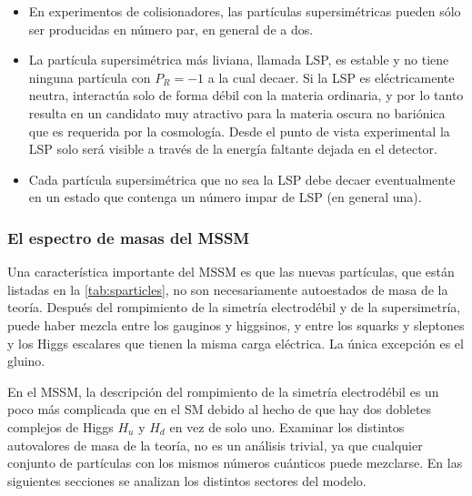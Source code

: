 \begin{itemize}
\item En experimentos de colisionadores, las partículas supersimétricas pueden
  sólo ser producidas en número par, en general de a dos.
\item La partícula supersimétrica más liviana, llamada LSP, es estable y no tiene
  ninguna partícula con $P_R = -1$ a la cual decaer. Si
  la LSP es eléctricamente neutra, interactúa solo de forma débil con la materia
  ordinaria, y por lo tanto resulta en un candidato muy atractivo para la
  materia oscura no bariónica que es requerida por la cosmología. Desde el punto de
  vista experimental la LSP solo será visible a través de la energía faltante
  dejada en el detector.
\item Cada partícula supersimétrica que no sea la LSP debe decaer eventualmente
  en un estado que contenga un número impar de LSP (en general una).
\end{itemize}



\subsubsection{El espectro de masas del MSSM}

Una característica importante del MSSM es que las nuevas partículas, que están
listadas en la \cref{tab:sparticles}, no son necesariamente autoestados de masa
de la teoría. Después del rompimiento de la simetría electrodébil
y de la supersimetría, puede haber mezcla entre los gauginos y higgsinos, y
entre los squarks y sleptones y los Higgs escalares que tienen la misma carga
eléctrica. La única excepción es el gluino.

En el MSSM, la descripción del rompimiento de la simetría electrodébil es un
poco más complicada que en el SM debido al hecho de que hay dos dobletes
complejos de Higgs $H_u$ y $H_d$ en vez de solo uno.
Examinar los distintos autovalores de masa de la teoría, no es un análisis
trivial, ya que cualquier conjunto de partículas con los mismos números
cuánticos puede mezclarse. En las siguientes secciones se analizan los distintos
sectores del modelo.



